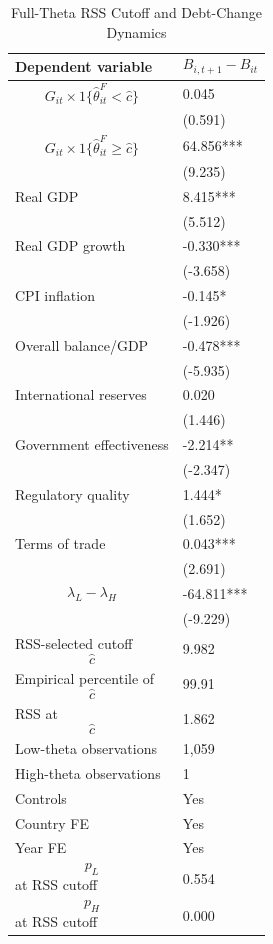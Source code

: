 \begin{table}[H]\centering
\begin{threeparttable}
\caption{Full-Theta RSS Cutoff and Debt-Change Dynamics}
\label{tab:deltaB_rss_cutoff_fulltheta}
\scriptsize
\begin{tabularx}{\textwidth}{lY}
\toprule
Dependent variable & $$B_{i,t+1}-B_{it}$$ \\
\midrule
$$G_{it}\times 1\{\widehat{\theta}^{F}_{it}<\widehat{c}\}$$ & 0.045 \\
 & (0.591) \\
$$G_{it}\times 1\{\widehat{\theta}^{F}_{it}\geq\widehat{c}\}$$ & 64.856*** \\
 & (9.235) \\
Real GDP & 8.415*** \\
 & (5.512) \\
Real GDP growth & -0.330*** \\
 & (-3.658) \\
CPI inflation & -0.145* \\
 & (-1.926) \\
Overall balance/GDP & -0.478*** \\
 & (-5.935) \\
International reserves & 0.020 \\
 & (1.446) \\
Government effectiveness & -2.214** \\
 & (-2.347) \\
Regulatory quality & 1.444* \\
 & (1.652) \\
Terms of trade & 0.043*** \\
 & (2.691) \\
$$\lambda_L-\lambda_H$$ & -64.811*** \\
 & (-9.229) \\
\midrule
RSS-selected cutoff $$\widehat{c}$$ & 9.982 \\
Empirical percentile of $$\widehat{c}$$ & 99.91 \\
RSS at $$\widehat{c}$$ & 1.862 \\
Low-theta observations & 1,059 \\
High-theta observations & 1 \\
Controls & Yes \\
Country FE & Yes \\
Year FE & Yes \\
$$p_L$$ at RSS cutoff & 0.554 \\
$$p_H$$ at RSS cutoff & 0.000 \\

\end{tabularx}
\end{threeparttable}
\end{table}
